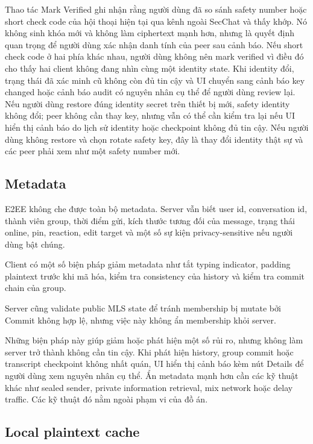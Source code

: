 Thao tác Mark Verified ghi nhận rằng người dùng đã so sánh safety number hoặc short check code của hội thoại hiện tại qua kênh ngoài SecChat và thấy khớp. Nó không sinh khóa mới và không làm ciphertext mạnh hơn, nhưng là quyết định quan trọng để người dùng xác nhận danh tính của peer sau cảnh báo. Nếu short check code ở hai phía khác nhau, người dùng không nên mark verified vì điều đó cho thấy hai client không đang nhìn cùng một identity state. Khi identity đổi, trạng thái đã xác minh cũ không còn đủ tin cậy và UI chuyển sang cảnh báo key changed hoặc cảnh báo audit có nguyên nhân cụ thể để người dùng review lại. Nếu người dùng restore đúng identity secret trên thiết bị mới, safety identity không đổi; peer không cần thay key, nhưng vẫn có thể cần kiểm tra lại nếu UI hiển thị cảnh báo do lịch sử identity hoặc checkpoint không đủ tin cậy. Nếu người dùng không restore và chọn rotate safety key, đây là thay đổi identity thật sự và các peer phải xem như một safety number mới.

\subsection{Metadata}

E2EE không che được toàn bộ metadata. Server vẫn biết user id, conversation id, thành viên group, thời điểm gửi, kích thước tương đối của message, trạng thái online, pin, reaction, edit target và một số sự kiện privacy-sensitive nếu người dùng bật chúng. 

Client có một số biện pháp giảm metadata như tắt typing indicator, padding plaintext trước khi mã hóa, kiểm tra consistency của history và kiểm tra commit chain của group. 

Server cũng validate public MLS state để tránh membership bị mutate bởi Commit không hợp lệ, nhưng việc này không ẩn membership khỏi server. 

Những biện pháp này giúp giảm hoặc phát hiện một số rủi ro, nhưng không làm server trở thành không cần tin cậy. Khi phát hiện history, group commit hoặc transcript checkpoint không nhất quán, UI hiển thị cảnh báo kèm nút Details để người dùng xem nguyên nhân cụ thể. Ẩn metadata mạnh hơn cần các kỹ thuật khác như sealed sender, private information retrieval, mix network hoặc delay traffic. Các kỹ thuật đó nằm ngoài phạm vi của đồ án.

\subsection{Local plaintext cache}

